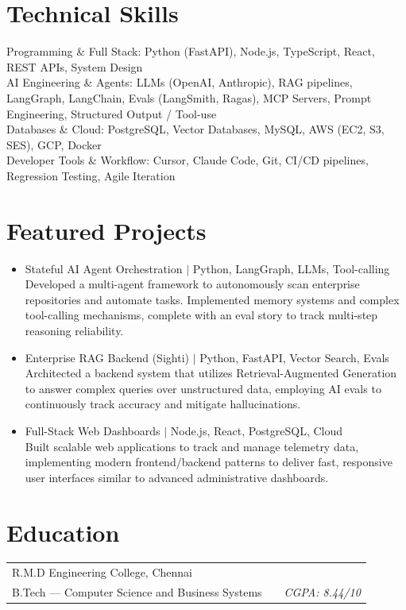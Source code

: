 \documentclass[a4paper,10pt]{article}
\begin{document}
\section{Technical Skills}
\noindent
Programming \& Full Stack: Python (FastAPI), Node.js, TypeScript, React, REST APIs, System Design \\
AI Engineering \& Agents: LLMs (OpenAI, Anthropic), RAG pipelines, LangGraph, LangChain, Evals (LangSmith, Ragas), MCP Servers, Prompt Engineering, Structured Output / Tool-use \\
Databases \& Cloud: PostgreSQL, Vector Databases, MySQL, AWS (EC2, S3, SES), GCP, Docker \\
Developer Tools \& Workflow: Cursor, Claude Code, Git, CI/CD pipelines, Regression Testing, Agile Iteration

\section{Featured Projects}
\begin{itemize}[nosep, leftmargin=1.5em, itemsep=2pt, parsep=0pt]
\item Stateful AI Agent Orchestration $|$ Python, LangGraph, LLMs, Tool-calling \\
Developed a multi-agent framework to autonomously scan enterprise repositories and automate tasks. Implemented memory systems and complex tool-calling mechanisms, complete with an eval story to track multi-step reasoning reliability.
\item Enterprise RAG Backend (Sighti) $|$ Python, FastAPI, Vector Search, Evals \\
Architected a backend system that utilizes Retrieval-Augmented Generation to answer complex queries over unstructured data, employing AI evals to continuously track accuracy and mitigate hallucinations.
\item Full-Stack Web Dashboards $|$ Node.js, React, PostgreSQL, Cloud \\
Built scalable web applications to track and manage telemetry data, implementing modern frontend/backend patterns to deliver fast, responsive user interfaces similar to advanced administrative dashboards.
\end{itemize}

\section{Education}
\begin{tabularx}{\linewidth}{ @{}l X r@{} }
R.M.D Engineering College, Chennai & & \\
B.Tech — Computer Science and Business Systems & & \textit{CGPA: 8.44/10}
\end{tabularx}
\end{document}
